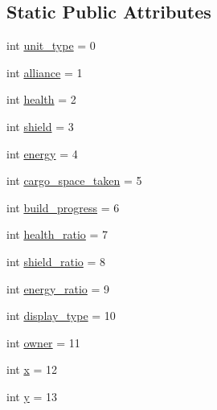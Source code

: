 \subsection*{Static Public Attributes}
\begin{DoxyCompactItemize}
\item 
int \mbox{\hyperlink{classpysc2_1_1lib_1_1features_1_1_feature_unit_a984d41a1fb3501844c91f06db01df36e}{unit\+\_\+type}} = 0
\item 
int \mbox{\hyperlink{classpysc2_1_1lib_1_1features_1_1_feature_unit_a1851bf7e1192818d533104abefb9bebe}{alliance}} = 1
\item 
int \mbox{\hyperlink{classpysc2_1_1lib_1_1features_1_1_feature_unit_a0ae8311cdeac1c2e6a2c8054884884bf}{health}} = 2
\item 
int \mbox{\hyperlink{classpysc2_1_1lib_1_1features_1_1_feature_unit_a74785179227770fa126f8c2711731cd2}{shield}} = 3
\item 
int \mbox{\hyperlink{classpysc2_1_1lib_1_1features_1_1_feature_unit_abd505bf044c3a0e9dbc0b706b55c52b9}{energy}} = 4
\item 
int \mbox{\hyperlink{classpysc2_1_1lib_1_1features_1_1_feature_unit_ab4efafc4a507de84958c06911238097b}{cargo\+\_\+space\+\_\+taken}} = 5
\item 
int \mbox{\hyperlink{classpysc2_1_1lib_1_1features_1_1_feature_unit_a44d315908a65730ac43e35a2788bba34}{build\+\_\+progress}} = 6
\item 
int \mbox{\hyperlink{classpysc2_1_1lib_1_1features_1_1_feature_unit_a3e572b847d1be4468461f1859b30f237}{health\+\_\+ratio}} = 7
\item 
int \mbox{\hyperlink{classpysc2_1_1lib_1_1features_1_1_feature_unit_a603ea33bd99e5bc81bcc6c0329301830}{shield\+\_\+ratio}} = 8
\item 
int \mbox{\hyperlink{classpysc2_1_1lib_1_1features_1_1_feature_unit_a67bb060d4d31601806053ff3d7a2e463}{energy\+\_\+ratio}} = 9
\item 
int \mbox{\hyperlink{classpysc2_1_1lib_1_1features_1_1_feature_unit_acdac6d62f36fc9623ba2ea2cd328ea8f}{display\+\_\+type}} = 10
\item 
int \mbox{\hyperlink{classpysc2_1_1lib_1_1features_1_1_feature_unit_af878a27434fcd99e7714eacda482087f}{owner}} = 11
\item 
int \mbox{\hyperlink{classpysc2_1_1lib_1_1features_1_1_feature_unit_ad947e850a2efadb4d6e4b6347574f260}{x}} = 12
\item 
int \mbox{\hyperlink{classpysc2_1_1lib_1_1features_1_1_feature_unit_a450e6fffdc395bc7b3809aa5ecf8c550}{y}} = 13

\end{DoxyCompactItemize}
